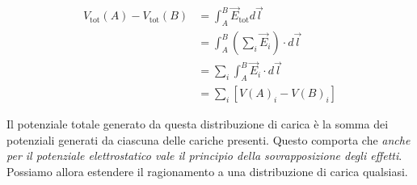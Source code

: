 \begin{align*}
	V_{\text{tot}} (A) - V_{\text{tot}} (B) &= \int_A^B \vec{E}_{\text{tot}}d\vec{l} \\
	&= \int_A^B \left( \sum\nolimits_i \vec{E}_i   \right) \cdot  d\vec{l} \\
	&= \sum\nolimits_i \int_A^B \vec{E}_i\cdot d\vec{l} \\
	&= \sum\nolimits_i \left[ V(A)_i - V(B)_i   \right]
\end{align*}

Il potenziale totale generato da questa distribuzione di carica è la somma dei potenziali generati da ciascuna delle cariche presenti. Questo comporta che \emph{anche per il potenziale elettrostatico vale il principio della sovrapposizione degli effetti}. Possiamo allora estendere il ragionamento a una distribuzione di carica qualsiasi.

